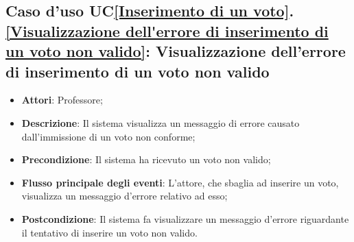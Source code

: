 \subsection{Caso d'uso UC\ref{Inserimento di un voto}.\ref{Visualizzazione dell'errore di inserimento di un voto non valido}: Visualizzazione dell'errore di inserimento di un voto non valido}
\begin{itemize}
	\item \textbf{Attori}: Professore;
	\item \textbf{Descrizione}: Il sistema visualizza un messaggio di errore causato dall'immissione di un voto non conforme;
	\item \textbf{Precondizione}: Il sistema ha ricevuto un voto non valido;
	
	\item \textbf{Flusso principale degli eventi}: L'attore, che sbaglia ad inserire un voto, visualizza un messaggio d'errore relativo ad esso;
	\item \textbf{Postcondizione}: Il sistema fa visualizzare un messaggio d'errore riguardante il tentativo di inserire un voto non valido.
\end{itemize}




